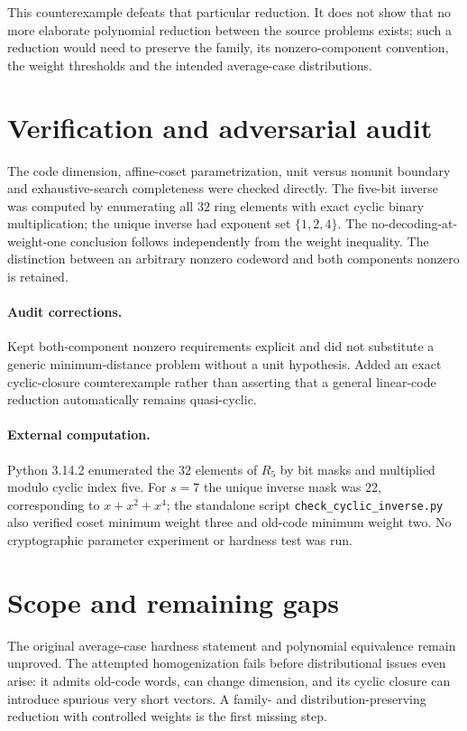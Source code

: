 \documentclass[11pt]{article}
\begin{document}
This counterexample defeats that particular reduction. It does not show that no more elaborate polynomial reduction between the source problems exists; such a reduction would need to preserve the family, its nonzero-component convention, the weight thresholds and the intended average-case distributions.
\section{Verification and adversarial audit}
The code dimension, affine-coset parametrization, unit versus nonunit boundary and exhaustive-search completeness were checked directly. The five-bit inverse was computed by enumerating all $32$ ring elements with exact cyclic binary multiplication; the unique inverse had exponent set $\{1,2,4\}$. The no-decoding-at-weight-one conclusion follows independently from the weight inequality. The distinction between an arbitrary nonzero codeword and both components nonzero is retained.
\paragraph{Audit corrections.} Kept both-component nonzero requirements explicit and did not substitute a generic minimum-distance problem without a unit hypothesis. Added an exact cyclic-closure counterexample rather than asserting that a general linear-code reduction automatically remains quasi-cyclic.
\paragraph{External computation.} Python 3.14.2 enumerated the $32$ elements of $R_5$ by bit masks and multiplied modulo cyclic index five. For $s=7$ the unique inverse mask was $22$, corresponding to $x+x^2+x^4$; the standalone script \texttt{check\_cyclic\_inverse.py} also verified coset minimum weight three and old-code minimum weight two. No cryptographic parameter experiment or hardness test was run.
\section{Scope and remaining gaps}
The original average-case hardness statement and polynomial equivalence remain unproved. The attempted homogenization fails before distributional issues even arise: it admits old-code words, can change dimension, and its cyclic closure can introduce spurious very short vectors. A family- and distribution-preserving reduction with controlled weights is the first missing step.
\end{document}
